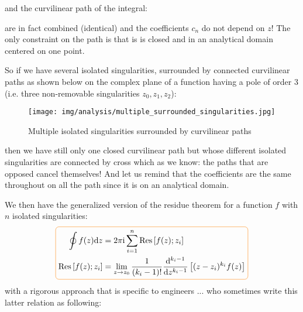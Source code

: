 	and the curvilinear path of the integral:
	
	are in fact combined (identical) and the coefficients $c_n$ do not depend on $z$! The only constraint on the path is that is is closed and in an analytical domain centered on one point.
	
	So if we have several isolated singularities, surrounded by connected curvilinear paths as shown below on the complex plane of a function having a pole of order 3 (i.e. three non-removable singularities $z_0,z_1,z_2$):
	\begin{figure}[H]
		\centering
		\texttt{[image: img/analysis/multiple\_surrounded\_singularities.jpg]}
		\caption{Multiple isolated singularities surrounded by curvilinear paths}
	\end{figure}
	then we have still only one closed curvilinear path but whose different isolated singularities are connected by cross which as we know: the paths that are opposed  cancel themselves! And let us remind that the coefficients are the same throughout on all the path since it is on an analytical domain.
	
	We then have the generalized version of the residue theorem for a function $f$ with $n$ isolated singularities:
	\begin{equation}
  		\addtolength{\fboxsep}{5pt}
	   \boxed{
	   \begin{gathered}
	   		\begin{aligned}
			\oint f(z)\mathrm{d}z&=2\pi\mathrm{i}\sum_{i=1}^n \text{Res}\left[f(z);z_i\right]\\
			\text{Res}\left[f(z);z_i\right]&=\lim_{z \rightarrow z_0}\dfrac{1}{(k_i-1)!}\dfrac{\mathrm{d}^{k_i-1}}{\mathrm{d}z^{k_i-1}}\left[(z-z_i)^{k_i}f(z)\right]
	   		\end{aligned}
	   \end{gathered}
	   }
	\end{equation}
	with a rigorous approach that is specific to engineers ... who sometimes write this latter relation as following:
	
